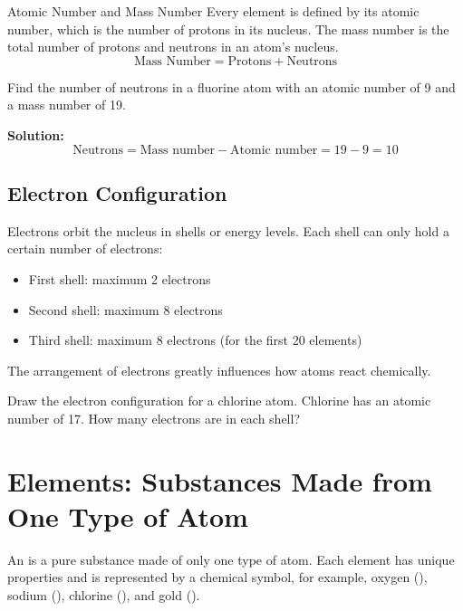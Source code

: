 \begin{keyconcept}{Atomic Number and Mass Number}
Every element is defined by its atomic number, which is the number of protons in its nucleus. The mass number is the total number of protons and neutrons in an atom's nucleus.
\[\text{Mass Number} = \text{Protons} + \text{Neutrons}\]
\end{keyconcept}

\begin{example}
Find the number of neutrons in a fluorine atom with an atomic number of 9 and a mass number of 19.

\textbf{Solution:}
\[
\text{Neutrons} = \text{Mass number} - \text{Atomic number} = 19 - 9 = 10
\]
\end{example}


\subsection{Electron Configuration}

Electrons orbit the nucleus in shells or energy levels. Each shell can only hold a certain number of electrons:
\begin{itemize}
    \item First shell: maximum 2 electrons
    \item Second shell: maximum 8 electrons
    \item Third shell: maximum 8 electrons (for the first 20 elements)
\end{itemize}

The arrangement of electrons greatly influences how atoms react chemically.

\begin{stopandthink}
Draw the electron configuration for a chlorine atom. Chlorine has an atomic number of 17. How many electrons are in each shell?
\end{stopandthink}

\section{Elements: Substances Made from One Type of Atom}

An  is a pure substance made of only one type of atom. Each element has unique properties and is represented by a chemical symbol, for example, oxygen (), sodium (), chlorine (), and gold ().

